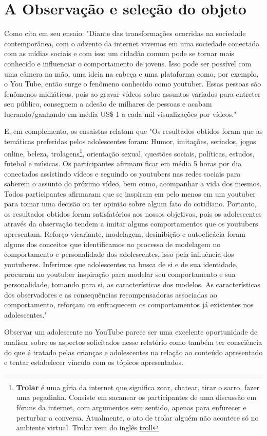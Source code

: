 \section{A Observação e seleção do objeto}

Como cita  em seu ensaio: "Diante das transformações ocorridas na sociedade contemporânea, com o advento da internet vivemos em uma sociedade conectada com as mídias sociais e com isso um cidadão comum pode se tornar mais conhecido e influenciar o comportamento de jovens. Isso pode ser possível com uma câmera na mão, uma ideia na cabeça e uma plataforma como, por exemplo, o You Tube, então surge o fenômeno conhecido como youtuber. Essas pessoas são fenômenos midiáticos, pois ao gravar vídeos sobre assuntos variados para entreter seu público, conseguem a adesão de milhares de pessoas e acabam lucrando/ganhando em média US\$ 1 a cada mil visualizações por vídeos."

E, em complemento, os ensaistas relatam que "Os resultados obtidos foram que as temáticas preferidas pelos adolescentes foram: Humor, imitações, seriados, jogos online, beleza, trolagens\footnote{\textbf{Trolar} é uma gíria da internet que significa zoar, chatear, tirar o sarro, fazer uma pegadinha. Consiste em sacanear os participantes de uma discussão em fóruns da internet, com argumentos sem sentido, apenas para enfurecer e perturbar a conversa. Atualmente, o ato de trolar alguém não acontece só no ambiente virtual. Trolar vem do inglês \href{https://www.oxfordlearnersdictionaries.com/definition/english/troll_2}{troll} }, orientação sexual, questões sociais, políticas, estudos, futebol e músicas. Os participantes afirmam ficar em média 5 horas por dia conectados assistindo vídeos e seguindo os youtubers nas redes sociais para saberem o assunto do próximo vídeo, bem como, acompanhar a vida dos mesmos. Todos participantes afirmaram que se inspiram em pelo menos em um youtuber para tomar uma decisão ou ter opinião sobre algum fato do cotidiano. Portanto, os resultados obtidos foram satisfatórios aos nossos objetivos, pois os adolescentes através da observação tendem a imitar alguns comportamentos que os youtubers apresentam. Reforço vicariante, modelagem, desinibição e autoeficácia foram alguns dos conceitos que identificamos no processo de modelagem no comportamento e personalidade dos adolescentes, isso pela influência dos youtuberes. Inferimos que adolescentes na busca de si e de sua identidade, procuram no youtuber inspiração para modelar seu comportamento e sua personalidade, tomando para si, as características dos modelos. As características dos observadores e as consequências recompensadoras associadas ao comportamento, reforçam ou enfraquecem os comportamentos já existentes nos adolescentes."

Observar um adolescente no YouTube parece ser uma excelente oportunidade de analisar sobre os aspectos solicitados nesse relatório como também ter consciência do que é tratado pelas crianças e adolescentes na relação ao conteúdo apresentado e tentar estabelecer vínculo com os tópicos apresentados.
